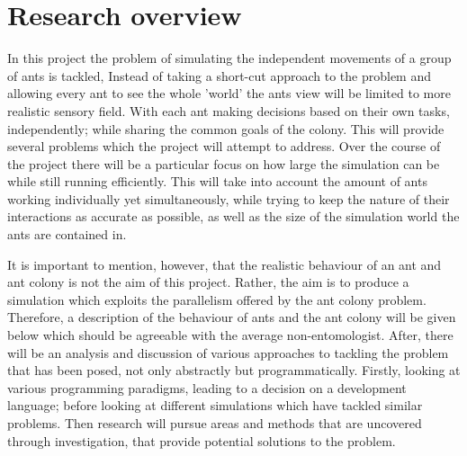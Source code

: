 \documentclass[main.tex]{subfiles}
\begin{document}

\section{Research overview}
In this project the problem of simulating the independent movements of a group of ants is tackled, Instead of taking a short-cut approach to the problem and allowing every ant to see the whole 'world' the ants view will be limited to more realistic sensory field. With each ant making decisions based on their own tasks, independently; while sharing the common goals of the colony. This will provide several problems which the project will attempt to address. Over the course of the project there will be a particular focus on how large the simulation can be while still running efficiently. This will take into account the amount of ants working individually yet simultaneously, while trying to keep the nature of their interactions as accurate as possible, as well as the size of the simulation world the ants are contained in.

It is important to mention, however, that the realistic behaviour of an ant and ant colony is not the aim of this project. Rather, the aim is to produce a simulation which exploits the parallelism offered by the ant colony problem. Therefore, a description of the behaviour of ants and the ant colony will be given below which should be agreeable with the average non-entomologist. After, there will be an analysis and discussion of various approaches to tackling the problem that has been posed, not only abstractly but programmatically. Firstly, looking at various programming paradigms, leading to a decision on a development language; before looking at different simulations which have tackled similar problems. Then research will pursue areas and methods that are uncovered through investigation, that provide potential solutions to the problem.

\end{document}
